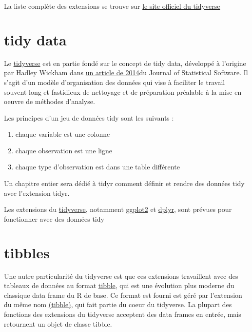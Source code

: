 \documentclass[
]{book}
\providecommand{\tightlist}{%
  \setlength{\itemsep}{0pt}\setlength{\parskip}{0pt}}
\begin{document}
La liste complète des extensions se trouve sur \href{https://www.tidyverse.org/packages/}{le site officiel du tidyverse}

\hypertarget{tidy-data}{%
\section{tidy data}\label{tidy-data}}

Le \href{http://rdrr.io/pkg/tidyverse}{tidyverse} est en partie fondé sur le concept de tidy data, développé à l'origine par Hadley Wickham dans \href{https://www.jstatsoft.org/article/view/v059i10}{un article de 2014}du Journal of Statistical Software.
Il s'agit d'un modèle d'organisation des données qui vise à faciliter le travail souvent long et fastidieux de nettoyage et de préparation préalable à la mise en oeuvre de méthodes d'analyse.

Les principes d'un jeu de données tidy sont les suivants :

\begin{enumerate}
\def\labelenumi{\arabic{enumi}.}
\tightlist
\item
  chaque variable est une colonne
\item
  chaque observation est une ligne
\item
  chaque type d'observation est dans une table différente
\end{enumerate}

Un chapitre entier sera dédié à tidyr comment définir et rendre des données tidy avec l'extension tidyr.

Les extensions du \href{http://rdrr.io/pkg/tidyverse}{tidyverse}, notamment \href{http://rdrr.io/pkg/ggplot2}{ggplot2} et \href{http://rdrr.io/pkg/dplyr}{dplyr}, sont prévues pour fonctionner avec des données tidy

\hypertarget{tibbles}{%
\section{tibbles}\label{tibbles}}

Une autre particularité du tidyverse est que ces extensions travaillent avec des tableaux de données au format \href{http://rdrr.io/pkg/tibble/sym/tibble}{tibble}, qui est une évolution plus moderne du classique data frame du R de base. Ce format est fourni est géré par l'extension du même nom \href{http://rdrr.io/pkg/tibble/sym/tibble}{(tibble)}, qui fait partie du coeur du tidyverse. La plupart des fonctions des extensions du tidyverse acceptent des data frames en entrée, mais retournent un objet de classe tibble.
\end{document}
